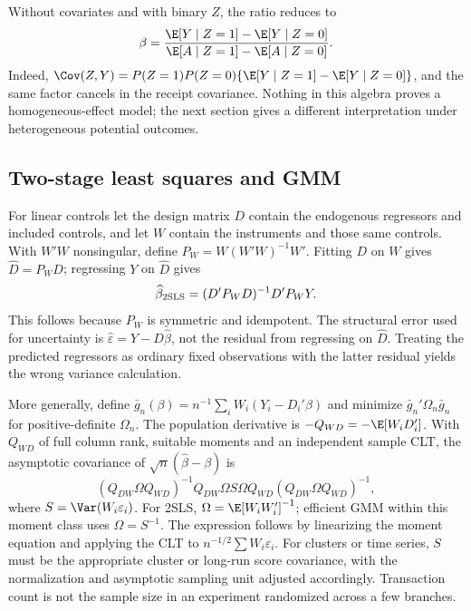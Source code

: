 Without covariates and with binary $Z$, the ratio reduces to
\begin{equation}
 \beta=\frac{\E[Y\mid Z=1]-\E[Y\mid Z=0]}
                   {\E[A\mid Z=1]-\E[A\mid Z=0]}.
 \label{r3:wald}
\end{equation}
Indeed, $\Cov(Z,Y)=P(Z=1)P(Z=0)\{\E[Y\mid Z=1]-\E[Y\mid Z=0]\}$,
and the same factor cancels in the receipt covariance. Nothing in this
algebra proves a homogeneous-effect model; the next section gives a
different interpretation under heterogeneous potential outcomes.

\subsection{Two-stage least squares and GMM}
For linear controls let the design matrix $D$ contain the endogenous
regressors and included controls, and let $W$ contain the instruments and
those same controls. With $W'W$ nonsingular, define
$P_W=W(W'W)^{-1}W'$. Fitting $D$ on $W$ gives $\widehat D=P_WD$;
regressing $Y$ on $\widehat D$ gives
\begin{equation}
 \widehat\beta_{\rm 2SLS}=(D'P_WD)^{-1}D'P_WY.
 \label{r3:2sls}
\end{equation}
This follows because $P_W$ is symmetric and idempotent. The structural
error used for uncertainty is $\widehat\varepsilon=Y-D\widehat\beta$,
not the residual from regressing on $\widehat D$. Treating the predicted
regressors as ordinary fixed observations with the latter residual yields
the wrong variance calculation.

More generally, define $\bar g_n(\beta)=n^{-1}\sum_iW_i(Y_i-D_i'\beta)$
and minimize $\bar g_n'\Omega_n\bar g_n$ for positive-definite
$\Omega_n$. The population derivative is $-Q_{WD}=-\E[W_iD_i']$.
With $Q_{WD}$ of full column rank, suitable moments and an independent
sample CLT, the asymptotic covariance of $\sqrt n(\widehat\beta-\beta)$ is
\begin{equation}
 (Q_{DW}\Omega Q_{WD})^{-1}Q_{DW}\Omega S\Omega Q_{WD}
 (Q_{DW}\Omega Q_{WD})^{-1},
 \label{r3:gmm-variance}
\end{equation}
where $S=\Var(W_i\varepsilon_i)$. For 2SLS,
$\Omega=\E[W_iW_i']^{-1}$; efficient GMM within this moment class uses
$\Omega=S^{-1}$. The expression follows by linearizing the moment
equation and applying the CLT to $n^{-1/2}\sum W_i\varepsilon_i$.
For clusters or time series, $S$ must be the appropriate cluster or
long-run score covariance, with the normalization and asymptotic sampling
unit adjusted accordingly. Transaction count is not the sample size in
an experiment randomized across a few branches.

